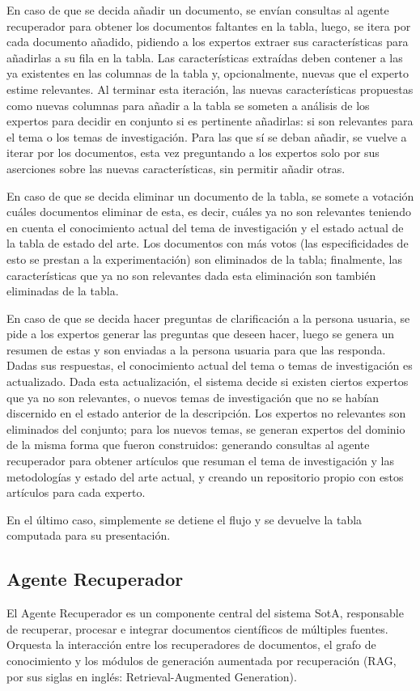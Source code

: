 \documentclass[12pt]{article}
\begin{document}
En caso de que se decida añadir un documento, se envían consultas al agente recuperador para obtener los documentos faltantes en la tabla, luego, se itera por cada documento añadido, pidiendo a los expertos extraer sus características para añadirlas a su fila en la tabla. Las características extraídas deben contener a las ya existentes en las columnas de la tabla y, opcionalmente, nuevas que el experto estime relevantes. Al terminar esta iteración, las nuevas características propuestas como nuevas columnas para añadir a la tabla se someten a análisis de los expertos para decidir en conjunto si es pertinente añadirlas: si son relevantes para el tema o los temas de investigación. Para las que sí se deban añadir, se vuelve a iterar por los documentos, esta vez preguntando a los expertos solo por sus aserciones sobre las nuevas características, sin permitir añadir otras.

En caso de que se decida eliminar un documento de la tabla, se somete a votación cuáles documentos eliminar de esta, es decir, cuáles ya no son relevantes teniendo en cuenta el conocimiento actual del tema de investigación y el estado actual de la tabla de estado del arte. Los documentos con más votos (las especificidades de esto se prestan a la experimentación) son eliminados de la tabla; finalmente, las características que ya no son relevantes dada esta eliminación son también eliminadas de la tabla.

En caso de que se decida hacer preguntas de clarificación a la persona usuaria, se pide a los expertos generar las preguntas que deseen hacer, luego se genera un resumen de estas y son enviadas a la persona usuaria para que las responda. Dadas sus respuestas, el conocimiento actual del tema o temas de investigación es actualizado. Dada esta actualización, el sistema decide si existen ciertos expertos que ya no son relevantes, o nuevos temas de investigación que no se habían discernido en el estado anterior de la descripción. Los expertos no relevantes son eliminados del conjunto; para los nuevos temas, se generan expertos del dominio de la misma forma que fueron construidos: generando consultas al agente recuperador para obtener artículos que resuman el tema de investigación y las metodologías y estado del arte actual, y creando un repositorio propio con estos artículos para cada experto.

En el último caso, simplemente se detiene el flujo y se devuelve la tabla computada para su presentación.

\subsection{Agente Recuperador}
El Agente Recuperador es un componente central del sistema SotA, responsable de recuperar, procesar e integrar documentos científicos de múltiples fuentes. Orquesta la interacción entre los recuperadores de documentos, el grafo de conocimiento y los módulos de generación aumentada por recuperación (RAG, por sus siglas en inglés: Retrieval-Augmented Generation)\cite{Lewis2020RetrievalAugmentedGF,zhao2024retrievalaugmentedgenerationaigeneratedcontent}.
\end{document}
